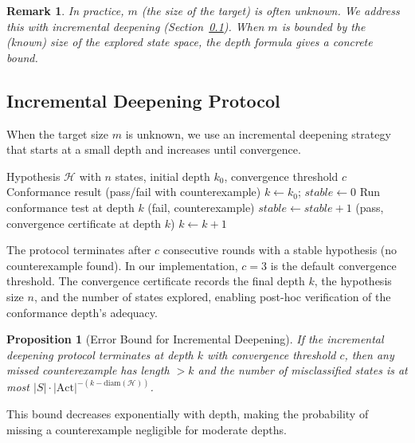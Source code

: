 \documentclass[11pt]{article}
\newtheorem{proposition}[theorem]{Proposition}
\newtheorem{remark}[theorem]{Remark}
\newcommand{\Act}{\ensuremath{\mathrm{Act}}}
\newcommand{\diam}{\ensuremath{\mathrm{diam}}}
\begin{document}
\begin{remark}
In practice, $m$ (the size of the target) is often unknown.
We address this with incremental deepening (Section~\ref{subsec:deepening}).
When $m$ is bounded by the (known) size of the explored state space,
the depth formula gives a concrete bound.
\end{remark}

\subsection{Incremental Deepening Protocol}
\label{subsec:deepening}

When the target size $m$ is unknown, we use an incremental deepening
strategy that starts at a small depth and increases until convergence.

\begin{algorithm}[t]
\caption{Incremental Deepening Conformance Testing}
\label{alg:deepen}
\begin{algorithmic}[1]
\Require Hypothesis $\mathcal{H}$ with $n$ states, initial depth $k_0$,
  convergence threshold $c$
\Ensure Conformance result (pass/fail with counterexample)
\State $k \gets k_0$; \; $\mathit{stable} \gets 0$
\Loop
  \State Run conformance test at depth $k$
    \State \Return (fail, counterexample)
  \EndIf
  \State $\mathit{stable} \gets \mathit{stable} + 1$
    \State \Return (pass, convergence certificate at depth $k$)
  \EndIf
  \State $k \gets k + 1$
\EndLoop
\end{algorithmic}
\end{algorithm}

The protocol terminates after $c$ consecutive rounds with a stable hypothesis
(no counterexample found).
In our implementation, $c = 3$ is the default convergence threshold.
The convergence certificate records the final depth $k$, the hypothesis
size $n$, and the number of states explored, enabling post-hoc verification
of the conformance depth's adequacy.

\begin{proposition}[Error Bound for Incremental Deepening]
\label{prop:error-bound}
If the incremental deepening protocol terminates at depth $k$ with
convergence threshold $c$, then any missed counterexample has length
$> k$ and the number of misclassified states is at most
$|S| \cdot |\Act|^{-(k - \diam(\mathcal{H}))}$.
\end{proposition}

This bound decreases exponentially with depth, making the probability of
missing a counterexample negligible for moderate depths.
\end{document}

